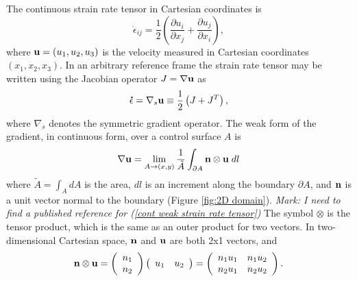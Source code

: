 \documentclass[11pt]{report}
\begin{document}
The continuous strain rate tensor in Cartesian coordinates is
\begin{equation}
\dot{\epsilon}_{ij} = \frac{1}{2}\left(\frac{\partial u_i}{\partial x_j} 
                                     + \frac{\partial u_j}{\partial x_i}\right),
\end{equation}
where ${\bf u} = (u_1,u_2,u_3)$ is the velocity measured in Cartesian coordinates $(x_1,x_2,x_3)$.  In an arbitrary reference frame the strain rate tensor may be written using the Jacobian operator $J=\nabla {\bf u}$ as
\begin{equation}
{\bf\dot{\epsilon}} = \nabla_s {\bf u} \equiv \frac{1}{2}\left(J + J^T\right),
\end{equation}
where $\nabla_s$ denotes the symmetric gradient operator.  The weak form of the gradient, in continuous form, over a control surface $A$  is
\begin{equation}
\label{cont weak strain rate tensor}
\nabla {\bf u}
= \lim_{A\rightarrow(x,y)} \frac{1}{\tilde{A}} 
\int_{\partial A}
  {\bf n}\otimes{\bf u} \; dl
\end{equation}
\cite[equation 22]{Ringler06unpub} where $\tilde{A} = \int_A dA$ is the area, $dl$ is an increment along the boundary $\partial A$, and ${\bf n}$ is a unit vector normal to the boundary (Figure \ref{fig:2D domain}).  {\it Mark: I need to find a published reference for (\ref{cont weak strain rate tensor})}  The symbol $\otimes$ is the tensor product, which is the same as an outer product for two vectors.  In two-dimensional Cartesian space, ${\bf n}$ and ${\bf u}$ are both 2x1 vectors, and 
\begin{equation}
{\bf n}\otimes{\bf u} 
= \left( \begin{array}{c} n_1 \\ n_2 \end{array}   \right)
  \left( \begin{array}{cc} u_1 &  u_2 \end{array} \right)
= \left( \begin{array}{cc} n_1 u_1 & n_1 u_2 \\  n_2 u_1 & n_2 u_2 \end{array}   \right).
\end{equation}
\end{document}
